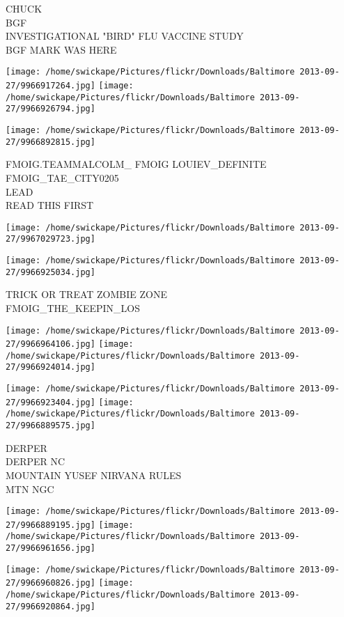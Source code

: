 \documentclass[10pt,letterpaper]{article}
\begin{document}
CHUCK\\
BGF\\
INVESTIGATIONAL "BIRD" FLU VACCINE STUDY\\
BGF MARK WAS HERE
\pagebreak

\texttt{[image: /home/swickape/Pictures/flickr/Downloads/Baltimore 2013-09-27/9966917264.jpg]}
\texttt{[image: /home/swickape/Pictures/flickr/Downloads/Baltimore 2013-09-27/9966926794.jpg]}

\texttt{[image: /home/swickape/Pictures/flickr/Downloads/Baltimore 2013-09-27/9966892815.jpg]}

FMOIG.TEAMMALCOLM\_ FMOIG LOUIEV\_DEFINITE FMOIG\_TAE\_CITY0205\\
LEAD\\
READ THIS FIRST
\pagebreak

\texttt{[image: /home/swickape/Pictures/flickr/Downloads/Baltimore 2013-09-27/9967029723.jpg]}

\vspace{0.25in}
\texttt{[image: /home/swickape/Pictures/flickr/Downloads/Baltimore 2013-09-27/9966925034.jpg]}

TRICK OR TREAT ZOMBIE ZONE\\
FMOIG\_THE\_KEEPIN\_LOS
\pagebreak

\texttt{[image: /home/swickape/Pictures/flickr/Downloads/Baltimore 2013-09-27/9966964106.jpg]}
\texttt{[image: /home/swickape/Pictures/flickr/Downloads/Baltimore 2013-09-27/9966924014.jpg]}

\texttt{[image: /home/swickape/Pictures/flickr/Downloads/Baltimore 2013-09-27/9966923404.jpg]}
\texttt{[image: /home/swickape/Pictures/flickr/Downloads/Baltimore 2013-09-27/9966889575.jpg]}

DERPER\\
DERPER NC\\
MOUNTAIN YUSEF NIRVANA RULES\\
MTN NGC
\pagebreak

\texttt{[image: /home/swickape/Pictures/flickr/Downloads/Baltimore 2013-09-27/9966889195.jpg]}
\texttt{[image: /home/swickape/Pictures/flickr/Downloads/Baltimore 2013-09-27/9966961656.jpg]}

\texttt{[image: /home/swickape/Pictures/flickr/Downloads/Baltimore 2013-09-27/9966960826.jpg]}
\texttt{[image: /home/swickape/Pictures/flickr/Downloads/Baltimore 2013-09-27/9966920864.jpg]}
\end{document}
